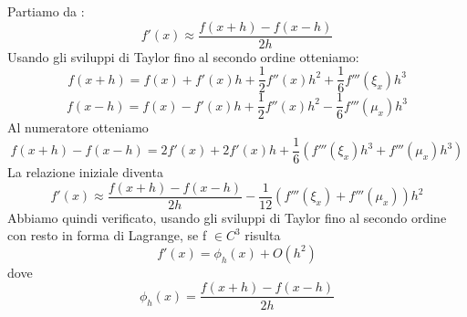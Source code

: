 Partiamo da :
	\[
	f'(x) \approx \frac{f(x+h) - f(x-h)}{2h}
	\]
Usando gli sviluppi di Taylor fino al secondo ordine otteniamo:
	\[
	f(x+h) = f(x) + f'(x)h + \frac{1}{2} f''(x)h^{2} + \frac{1}{6}f'''(\xi_x)h^{3}
	\]
	\[f(x-h) = f(x) - f'(x)h + \frac{1}{2} f''(x)h^{2} - \frac{1}{6}f'''(\mu_x)h^{3}
	\]
Al numeratore otteniamo
	\[
	f(x+h) - f(x-h) = 2f'(x) + 2f'(x)h + \frac{1}{6}(f'''(\xi_x)h^{3}+f'''(\mu_x)h^{3})
	\]
La relazione iniziale diventa
	\[
	f'(x) \approx \frac{f(x+h) - f(x-h)}{2h} - \frac{1}{12}(f'''(\xi_x) + f'''(\mu_x))h^{2}
	\]
Abbiamo quindi verificato, usando gli sviluppi di Taylor fino al secondo ordine con resto in forma di Lagrange, se f $\in C^{3}$ risulta
	\[
	f'(x) = \phi_h(x) + O(h^2)
	\]
dove
	\[
	\phi_h(x) = \frac{f(x+h) - f(x-h)}{2h}
	\]